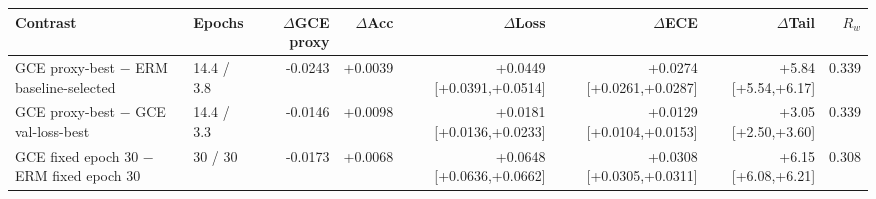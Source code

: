 \begin{tabular}{llrrrrrr}
\toprule
Contrast & Epochs & $\Delta$GCE proxy & $\Delta$Acc & $\Delta$Loss & $\Delta$ECE & $\Delta$Tail & $R_w$ \\
\midrule
GCE proxy-best $-$ ERM baseline-selected & 14.4 / 3.8 & -0.0243 & +0.0039 & +0.0449 [+0.0391,+0.0514] & +0.0274 [+0.0261,+0.0287] & +5.84 [+5.54,+6.17] & 0.339 \\
GCE proxy-best $-$ GCE val-loss-best & 14.4 / 3.3 & -0.0146 & +0.0098 & +0.0181 [+0.0136,+0.0233] & +0.0129 [+0.0104,+0.0153] & +3.05 [+2.50,+3.60] & 0.339 \\
GCE fixed epoch 30 $-$ ERM fixed epoch 30 & 30 / 30 & -0.0173 & +0.0068 & +0.0648 [+0.0636,+0.0662] & +0.0308 [+0.0305,+0.0311] & +6.15 [+6.08,+6.21] & 0.308 \\
\bottomrule
\end{tabular}
